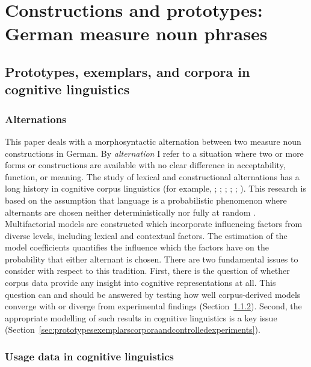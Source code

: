 \chapter{Constructions and prototypes: German measure noun phrases}
\label{sec:constructionsandprototypes}

\section{Prototypes, exemplars, and corpora in cognitive linguistics}
\label{sec:cogocl}

\subsection{Alternations}
\label{sec:alternations}

This paper deals with a morphosyntactic alternation between two measure noun constructions in German.
By \textit{alternation} I refer to a situation where two or more forms or constructions are available with no clear difference in acceptability, function, or meaning.
The study of lexical and constructional alternations has a long history in cognitive corpus linguistics (for example, \citealp{BresnanEa2007}; \citealt{BresnanHay2010}; \citealt{BresnanFord2010}; \citealt{DivjakArppe2013}; \citealt{Gries2015}; \citealt{NessetJanda2010}).
This research is based on the assumption that language is a probabilistic phenomenon where alternants are chosen neither deterministically nor fully at random \citep{Bresnan2007}.
Multifactorial models are constructed which incorporate influencing factors from diverse levels, including lexical and contextual factors.
The estimation of the model coefficients quantifies the influence which the factors have on the probability that either alternant is chosen.
There are two fundamental issues to consider with respect to this tradition.
First, there is the question of whether corpus data provide any insight into cognitive representations at all.
This question can and should be answered by testing how well corpus-derived models converge with or diverge from experimental findings (Section~\ref{sec:usagedataincognitivelinguistics}).
Second, the appropriate modelling of such results in cognitive linguistics is a key issue (Section~\ref{sec:prototypesexemplarscorporaandcontrolledexperiments}).

\subsection{Usage data in cognitive linguistics}
\label{sec:usagedataincognitivelinguistics}

